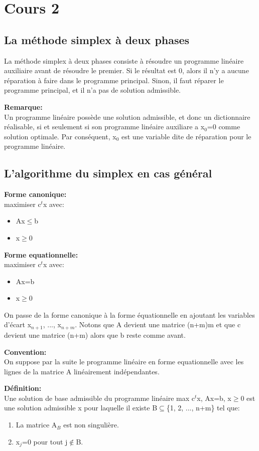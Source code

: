 \section{Cours 2}
\subsection{La méthode simplex à deux phases}
La méthode simplex à deux phases consiste à résoudre un programme linéaire auxiliaire avant de résoudre le premier.
Si le résultat est 0, alors il n'y a aucune réparation à faire dans le programme principal. Sinon, il faut réparer
le programme principal, et il n'a pas de solution admissible.

\textbf{Remarque:\\}
Un programme linéaire possède une solution admissible, et donc un dictionnaire réalisable, si et seulement si
son programme linéaire auxiliare a x$_0$=0 comme solution optimale. Par conséquent, x$_0$ est une variable dite de
réparation pour le programme linéaire.

\subsection{L'algorithme du simplex en cas général}
\textbf{Forme canonique:\\}
maximiser c$^t$x avec:
\begin{itemize}
	\item Ax$\leq$b
	\item x$\geq$0
\end{itemize}
\textbf{Forme equationnelle:\\}
maximiser c$^t$x avec:
\begin{itemize}
	\item Ax=b
	\item x$\geq$0
\end{itemize}

On passe de la forme canonique à la forme équationnelle en ajoutant les variables d'écart x$_{n+1}$, ...,
x$_{n+m}$. Notons que A devient une matrice (n+m)m et que c devient une matrice (n+m) alors que b reste
comme avant.

\textbf{Convention:\\}
On suppose par la suite le programme linéaire en forme equationnelle avec les lignes de la matrice A linéairement
indépendantes.

\textbf{Définition:\\}
Une solution de base admissible du programme linéaire max c$^t$x, Ax=b, x$\geq$0 est une solution admissible x pour 
laquelle il existe B$\subseteq$\{1, 2, ..., n+m\} tel que:
\begin{enumerate}
	\item La matrice A$_B$ est non singulière.
	\item x$_j$=0 pour tout j$\not\in$B.
\end{enumerate}

